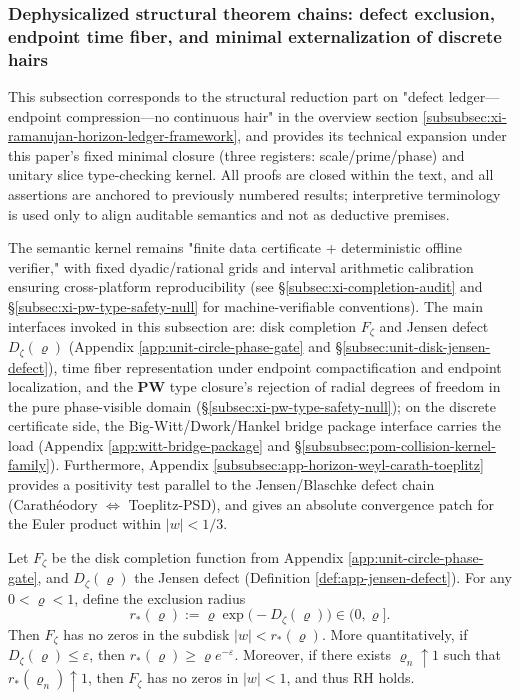 \subsubsection{Dephysicalized structural theorem chains: defect exclusion, endpoint time fiber, and minimal externalization of discrete hairs}\label{subsec:dephysicalized-horizon-timefiber-nohair}
This subsection corresponds to the structural reduction part on "defect ledger—endpoint compression—no continuous hair" in the overview section \ref{subsubsec:xi-ramanujan-horizon-ledger-framework}, and provides its technical expansion under this paper's fixed minimal closure (three registers: scale/prime/phase) and unitary slice type-checking kernel. All proofs are closed within the text, and all assertions are anchored to previously numbered results; interpretive terminology is used only to align auditable semantics and not as deductive premises.\par
The semantic kernel remains "finite data certificate + deterministic offline verifier," with fixed dyadic/rational grids and interval arithmetic calibration ensuring cross-platform reproducibility (see \S\ref{subsec:xi-completion-audit} and \S\ref{subsec:xi-pw-type-safety-null} for machine-verifiable conventions). The main interfaces invoked in this subsection are: disk completion \(F_{\zeta}\) and Jensen defect \(D_{\zeta}(\varrho)\) (Appendix \ref{app:unit-circle-phase-gate} and \S\ref{subsec:unit-disk-jensen-defect}), time fiber representation under endpoint compactification and endpoint localization, and the \(\mathbf{PW}\) type closure's rejection of radial degrees of freedom in the pure phase-visible domain (\S\ref{subsec:xi-pw-type-safety-null}); on the discrete certificate side, the Big-Witt/Dwork/Hankel bridge package interface carries the load (Appendix \ref{app:witt-bridge-package} and \S\ref{subsubsec:pom-collision-kernel-family}). Furthermore, Appendix \ref{subsubsec:app-horizon-weyl-carath-toeplitz} provides a positivity test parallel to the Jensen/Blaschke defect chain (Carathéodory \(\Leftrightarrow\) Toeplitz-PSD), and gives an absolute convergence patch for the Euler product within \(|w|<1/3\).

\begin{theorem}\label{thm:dephys-defect-repulsion-radius}
Let \(F_{\zeta}\) be the disk completion function from Appendix \ref{app:unit-circle-phase-gate}, and \(D_{\zeta}(\varrho)\) the Jensen defect (Definition \ref{def:app-jensen-defect}).
For any \(0<\varrho<1\), define the exclusion radius
\[
r_{\ast}(\varrho):=\varrho\exp\!\bigl(-D_{\zeta}(\varrho)\bigr)\in(0,\varrho].
\]
Then \(F_{\zeta}\) has no zeros in the subdisk \(|w|<r_{\ast}(\varrho)\).
More quantitatively, if \(D_{\zeta}(\varrho)\le \varepsilon\), then \(r_{\ast}(\varrho)\ge \varrho e^{-\varepsilon}\).
Moreover, if there exists \(\varrho_n\uparrow 1\) such that \(r_{\ast}(\varrho_n)\uparrow 1\), then \(F_{\zeta}\) has no zeros in \(|w|<1\), and thus RH holds.
\end{theorem}

